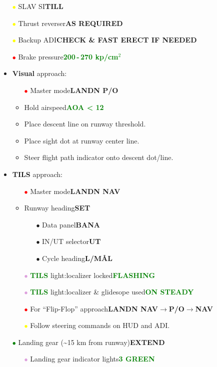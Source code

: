 \documentclass[a4paper,12pt,dvipsnames]{letter}
\newcommand{\grnb}[1]{\textcolor{Green}{\textbf{#1}}}
\newcommand{\button}[1]{\textbf{#1}}
\newcommand{\ok}[1]{\textcolor{Green}{\textbf{#1}}}
\newcommand{\bi}{\textcolor{ProcessBlue}{$\bullet$\;}}
\newcommand{\ri}{\textcolor{red}{$\bullet$\;}}
\newcommand{\gi}{\textcolor{Green}{$\bullet$\;}}
\newcommand{\yi}{\textcolor{Yellow}{$\bullet$\;}}
\newcommand{\vi}{\textcolor{Plum}{$\bullet$\;}}
\begin{document}
{\begin{itemize}
 \item[\yi] SLAV SI\dotfill\button{TILL}
 \item[\yi] Thrust reverser\dotfill\button{AS REQUIRED}
 \item[\yi] Backup ADI\dotfill\button{CHECK \& FAST ERECT IF NEEDED}
 \item[\ri] Brake pressure\dotfill\ok{200\,-\,270 kp/cm$^2$}
 \item \textbf{Visual} approach:
 \begin{itemize}
  \item[\ri] Master mode\dotfill\button{LANDN P/O}
  \item Hold airspeed\dotfill\ok{AOA < 12\textdegree{}}
  \item Place descent line on runway threshold.
  \item Place sight dot at runway center line.
  \item Steer flight path indicator onto descent dot/line.
 \end{itemize}
 \item \textbf{TILS} approach:
 \begin{itemize}
  \item[\ri] Master mode\dotfill\button{LANDN NAV}
  \item Runway heading\dotfill\button{SET}
  \begin{itemize}
   \item[\bi] Data panel\dotfill\button{BANA}
   \item[\bi] IN/UT selector\dotfill\button{UT}
   \item[\bi] Cycle heading\dotfill\button{L/M\AA L}
  \end{itemize}   
  \item[\vi] \grnb{TILS} light:\;localizer locked\dotfill\ok{FLASHING}
  \item[\vi] \grnb{TILS} light:\;localizer \& glidesope used\dotfill\ok{ON STEADY}
  \item[\ri] For ``Flip-Flop'' approach\dotfill\button{LANDN NAV\;$\rightarrow$\;P/O\;$\rightarrow$\;NAV}
  \item[\yi] Follow steering commands on HUD and ADI.
 \end{itemize}
%
 \item[\gi] Landing gear (\textasciitilde 15 km from runway)\dotfill\button{EXTEND}
 \begin{itemize}
  \item[\vi] Landing gear indicator lights\dotfill\ok{3 GREEN}
 \end{itemize}

\end{itemize}}
\end{document}

